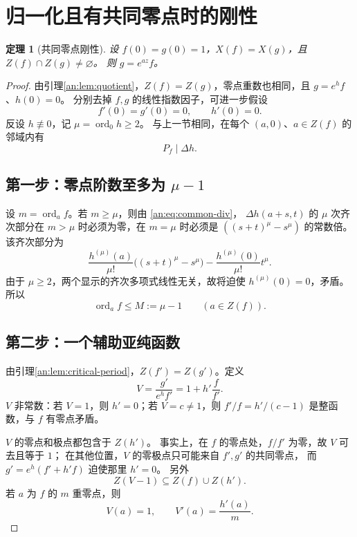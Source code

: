 \documentclass[11pt,a4paper,oneside,openany]{book}
\theoremstyle{lecture}
\newtheorem{theorem}{定理}[section]
\newcommand{\ord}{\operatorname{ord}}
\numberwithin{equation}{section}
\begin{document}
\section{归一化且有共同零点时的刚性}\label{an:sec:common-zero}
\begin{theorem}[共同零点刚性]\label{an:thm:common-zero}
设 $f(0)=g(0)=1$，$X(f)=X(g)$，且 $Z(f)\cap Z(g)\ne\varnothing$。
则 $g=e^{az}f$。
\end{theorem}
\begin{proof}
由引理\ref{an:lem:quotient}，$Z(f)=Z(g)$，零点重数也相同，且 $g=e^hf$、$h(0)=0$。
分别去掉 $f,g$ 的线性指数因子，可进一步假设
\begin{equation}\label{an:eq:common-norm}
 f'(0)=g'(0)=0,\qquad h'(0)=0.
\end{equation}
反设 $h\not\equiv0$，记 $\mu=\ord_0h\ge2$。
与上一节相同，在每个 $(a,0)$、$a\in Z(f)$ 的邻域内有
\begin{equation}\label{an:eq:common-div}
 P_f\mid\Delta h.
\end{equation}

\subsection*{第一步：零点阶数至多为 $\mu-1$}
设 $m=\ord_a f$。若 $m\ge \mu$，则由 \eqref{an:eq:common-div}，
$\Delta h(a+s,t)$ 的 $\mu$ 次齐次部分在 $m>\mu$ 时必须为零，在 $m=\mu$ 时必须是
$((s+t)^\mu-s^\mu)$ 的常数倍。
该齐次部分为
\[
 \frac{h^{(\mu)}(a)}{\mu!}\bigl((s+t)^\mu-s^\mu\bigr)
 -\frac{h^{(\mu)}(0)}{\mu!}t^\mu.
\]
由于 $\mu\ge2$，两个显示的齐次多项式线性无关，故将迫使 $h^{(\mu)}(0)=0$，矛盾。
所以
\begin{equation}\label{an:eq:common-multbound}
 \ord_a f\le M:=\mu-1\qquad(a\in Z(f)).
\end{equation}

\subsection*{第二步：一个辅助亚纯函数}
由引理\ref{an:lem:critical-period}，$Z(f')=Z(g')$。定义
\begin{equation}\label{an:eq:Vcommon}
 V=\frac{g'}{e^hf'}=1+h'\frac f{f'}.
\end{equation}
$V$ 非常数：若 $V=1$，则 $h'=0$；若 $V=c\ne1$，则
$f'/f=h'/(c-1)$ 是整函数，与 $f$ 有零点矛盾。

$V$ 的零点和极点都包含于 $Z(h')$。
事实上，在 $f$ 的零点处，$f/f'$ 为零，故 $V$ 可去且等于 $1$；
在其他位置，$V$ 的零极点只可能来自 $f',g'$ 的共同零点，
而 $g'=e^h(f'+h'f)$ 迫使那里 $h'=0$。
另外
\begin{equation}\label{an:eq:Vfacts}
 Z(V-1)\subseteq Z(f)\cup Z(h').
\end{equation}
若 $a$ 为 $f$ 的 $m$ 重零点，则
\begin{equation}\label{an:eq:Vatroot}
 V(a)=1,\qquad V'(a)=\frac{h'(a)}m.
\end{equation}


\end{proof}
\end{document}
